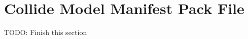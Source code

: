 \section{Collide Model Manifest Pack File}
\label{sec:pfcmaC}

TODO: Finish this section

\clearpage

